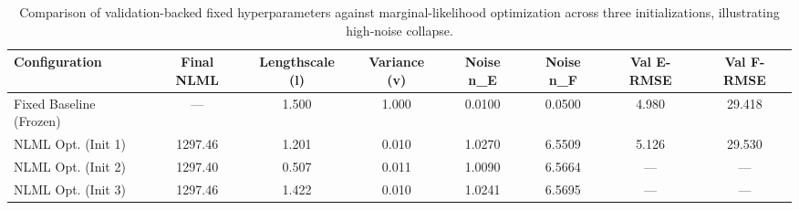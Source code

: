 \begin{table}[htbp]
\centering
\caption{Comparison of validation-backed fixed hyperparameters against marginal-likelihood optimization across three initializations, illustrating high-noise collapse.}
\label{tab:hyperparam_study}
\begin{tabular}{lccccccc}
\toprule
Configuration & Final NLML & Lengthscale (l) & Variance (v) & Noise n_E & Noise n_F & Val E-RMSE & Val F-RMSE \\
\midrule
Fixed Baseline (Frozen) & — & 1.500 & 1.000 & 0.0100 & 0.0500 & 4.980 & 29.418 \\
NLML Opt. (Init 1) & 1297.46 & 1.201 & 0.010 & 1.0270 & 6.5509 & 5.126 & 29.530 \\
NLML Opt. (Init 2) & 1297.40 & 0.507 & 0.011 & 1.0090 & 6.5664 & — & — \\
NLML Opt. (Init 3) & 1297.46 & 1.422 & 0.010 & 1.0241 & 6.5695 & — & — \\
\bottomrule
\end{tabular}
\end{table}
